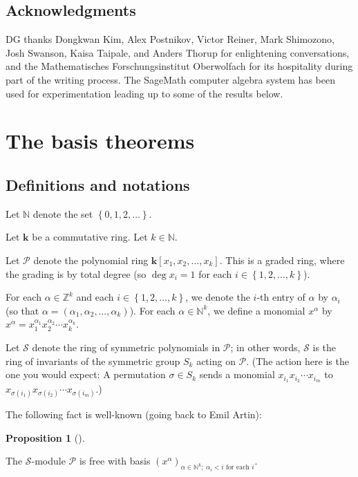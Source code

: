 \documentclass[numbers=enddot,12pt,final,onecolumn,notitlepage]{scrartcl}%
\theoremstyle{definition}
\newtheorem{prop}[theo]{Proposition}
\newenvironment{proposition}[1][]
{\begin{prop}[#1]\begin{leftbar}}
{\end{leftbar}\end{prop}}
\begin{document}
\subsection{Acknowledgments}

DG thanks Dongkwan Kim, Alex Postnikov, Victor Reiner, Mark Shimozono, Josh
Swanson, Kaisa Taipale, and Anders Thorup for enlightening conversations, and
the Mathematisches Forschungsinstitut Oberwolfach for its hospitality during
part of the writing process. The SageMath computer algebra system
\cite{SageMath} has been used for experimentation leading up to some of the
results below.

\section{The basis theorems}

\subsection{Definitions and notations}

Let $\mathbb{N}$ denote the set $\left\{  0,1,2,\ldots\right\}  $.

Let $\mathbf{k}$ be a commutative ring. Let $k\in\mathbb{N}$.

Let $\mathcal{P}$ denote the polynomial ring $\mathbf{k}\left[  x_{1}%
,x_{2},\ldots,x_{k}\right]  $. This is a graded ring, where the grading is by
total degree (so $\deg x_{i}=1$ for each $i\in\left\{  1,2,\ldots,k\right\}  $).

For each $\alpha\in\mathbb{Z}^{k}$ and each $i\in\left\{  1,2,\ldots
,k\right\}  $, we denote the $i$-th entry of $\alpha$ by $\alpha_{i}$ (so that
$\alpha=\left(  \alpha_{1},\alpha_{2},\ldots,\alpha_{k}\right)  $). For each
$\alpha\in\mathbb{N}^{k}$, we define a monomial $x^{\alpha}$ by $x^{\alpha
}=x_{1}^{\alpha_{1}}x_{2}^{\alpha_{2}}\cdots x_{k}^{\alpha_{k}}$.

Let $\mathcal{S}$ denote the ring of symmetric polynomials in $\mathcal{P}$;
in other words, $\mathcal{S}$ is the ring of invariants of the symmetric group
$S_{k}$ acting on $\mathcal{P}$. (The action here is the one you would expect:
A permutation $\sigma\in S_{k}$ sends a monomial $x_{i_{1}}x_{i_{2}}\cdots
x_{i_{m}}$ to $x_{\sigma\left(  i_{1}\right)  }x_{\sigma\left(  i_{2}\right)
}\cdots x_{\sigma\left(  i_{m}\right)  }$.)

The following fact is well-known (going back to Emil Artin):

\begin{proposition}
\label{prop.artin}The $\mathcal{S}$-module $\mathcal{P}$ is free with basis
$\left(  x^{\alpha}\right)  _{\alpha\in\mathbb{N}^{k};\ \alpha_{i}<i\text{ for
each }i}$.
\end{proposition}
\end{document}
